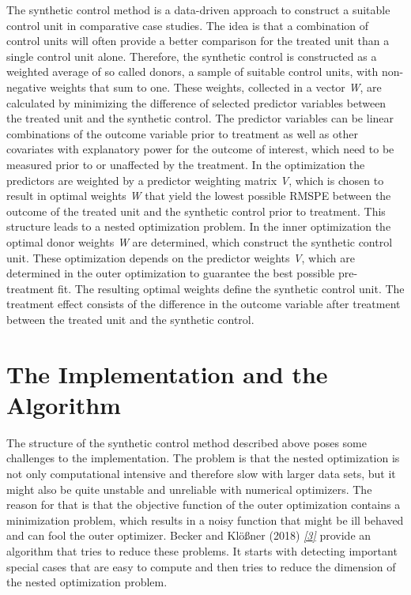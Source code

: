 \documentclass[a4paper,11pt,english]{sphinxmanual}
\begin{document}
The synthetic control method is a data-driven approach to construct a suitable control unit in comparative case studies. The idea is that a combination of control units will often provide a better comparison for the treated unit than a single control unit alone. Therefore, the synthetic control is constructed as a weighted average of so called donors, a sample of suitable control units, with non-negative weights that sum to one. These weights, collected in a vector \emph{W}, are calculated by minimizing the difference of selected predictor variables between the treated unit and the synthetic control. The predictor variables can be linear combinations of the outcome variable prior to treatment as well as other covariates with explanatory power for the outcome of interest, which need to be measured prior to or unaffected by the treatment. In the optimization the predictors are weighted by a predictor weighting matrix \emph{V}, which is chosen to result in optimal weights \emph{W} that yield the lowest possible RMSPE between the outcome of the treated unit and the synthetic control prior to treatment. This structure leads to a nested optimization problem. In the inner optimization the optimal donor weights \emph{W} are determined, which construct the synthetic control unit. These optimization depends on the predictor weights \emph{V}, which are determined in the outer optimization to guarantee the best possible pre-treatment fit. The resulting optimal weights define the synthetic control unit. The treatment effect consists of the difference in the outcome variable after treatment between the treated unit and the synthetic control.


\section{The Implementation and  the Algorithm}
\label{introduction:the-implementation-and-the-algorithm}
The structure of the synthetic control method described above poses some challenges to the implementation. The problem is that the nested optimization is not only computational intensive and therefore slow with larger data sets, but it might also be quite unstable and unreliable with numerical optimizers. The reason for that is that the objective function of the outer optimization contains a minimization problem, which results in a noisy function that might be ill behaved and can fool the outer optimizer. Becker and Klößner (2018) \label{introduction:id8}{\hyperref[references:becker2018]{\emph{{[}3{]}}}} provide an algorithm that tries to reduce these problems. It starts with detecting important special cases that are easy to compute and then tries to reduce the dimension of the nested optimization problem.
\end{document}
